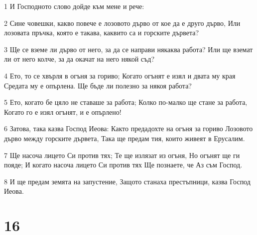 \par 1 И Господното слово дойде към мене и рече:
\par 2 Сине човешки, какво повече е лозовото дърво от кое да е друго дърво, Или лозовата пръчка, която е такава, каквито са и горските дървета?
\par 3 Ще се вземе ли дърво от него, за да се направи някаква работа? Или ще вземат ли от него колче, за да окачат на него някой съд?
\par 4 Ето, то се хвърля в огъня за гориво; Когато огънят е изял и двата му края Средата му е опърлена. Ще бъде ли полезно за някоя работа?
\par 5 Ето, когато бе цяло не ставаше за работа; Колко по-малко ще стане за работа, Когато го е изял огънят, и е опърлено!
\par 6 Затова, така казва Господ Иеова: Както предадохте на огъня за гориво Лозовото дърво между горските дървета, Така ще предам тия, които живеят в Ерусалим.
\par 7 Ще насоча лицето Си против тях; Те ще излязат из огъня, Но огънят ще ги пояде; И когато насоча лицето Си против тях Ще познаете, че Аз съм Господ.
\par 8 И ще предам земята на запустение, Защото станаха престъпници, казва Господ Иеова.

\chapter{16}

